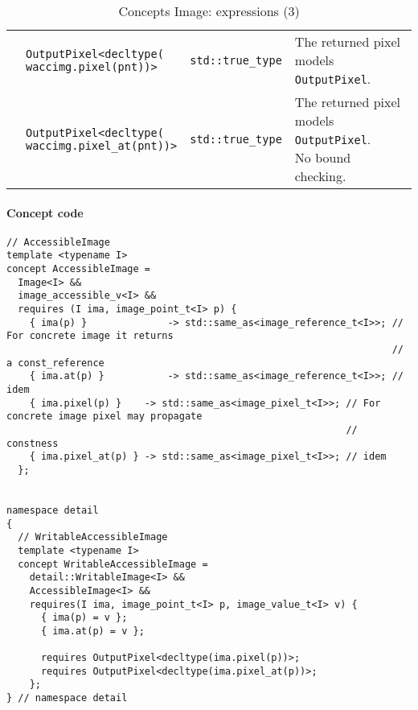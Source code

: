 \begin{table}[H]
\begin{scriptsize}
\begin{tabular}{llll}
      \multicolumn{1}{c|}{}                                 & \makecell[l]{\texttt{OutputPixel<decltype(}                                                                                         \\\texttt{waccimg.pixel(pnt))>}}                            & \texttt{std::true\_type}                      & \makecell[l]{The returned pixel \\ models \texttt{OutputPixel}.} \\
      \multicolumn{1}{c|}{}                                 & \makecell[l]{\texttt{OutputPixel<decltype(}                                                                                         \\\texttt{waccimg.pixel\_at(pnt))>}}                            & \texttt{std::true\_type}                      & \makecell[l]{The returned pixel \\ models \texttt{OutputPixel}. \\ No bound checking.} \\
      \cline{1-4}
    \end{tabular}
    \smallskip

    \caption{Concepts Image: expressions (3)}
  \end{scriptsize}
  \label{table:concept.image.expressions.3}
\end{table}

\paragraph{Concept code}

\begin{verbatim}
// AccessibleImage
template <typename I>
concept AccessibleImage =
  Image<I> &&
  image_accessible_v<I> &&
  requires (I ima, image_point_t<I> p) {
    { ima(p) }              -> std::same_as<image_reference_t<I>>; // For concrete image it returns
                                                                   // a const_reference
    { ima.at(p) }           -> std::same_as<image_reference_t<I>>; // idem
    { ima.pixel(p) }    -> std::same_as<image_pixel_t<I>>; // For concrete image pixel may propagate
                                                           // constness
    { ima.pixel_at(p) } -> std::same_as<image_pixel_t<I>>; // idem
  };


namespace detail
{
  // WritableAccessibleImage
  template <typename I>
  concept WritableAccessibleImage =
    detail::WritableImage<I> &&
    AccessibleImage<I> &&
    requires(I ima, image_point_t<I> p, image_value_t<I> v) {
      { ima(p) = v };
      { ima.at(p) = v };

      requires OutputPixel<decltype(ima.pixel(p))>;
      requires OutputPixel<decltype(ima.pixel_at(p))>;
    };
} // namespace detail
\end{verbatim}


